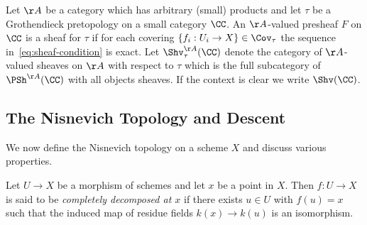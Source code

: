 \documentclass[12pt]{article}
\numberwithin{equation}{section}
\numberwithin{lemma}{section}
\numberwithin{theorem}{section}
\numberwithin{proposition}{section}
\numberwithin{corollary}{section}
\numberwithin{definition}{section}
\numberwithin{example}{section}
\numberwithin{remark}{section}
\begin{document}
\begin{definition}
  Let $\AA$ be a category which has arbitrary (small) products and let
  $\tau$ be a Grothendieck pretopology on a small category $\CC$. An
  $\AA$-valued presheaf $F$ on $\CC$ is a sheaf for $\tau$ if for each
  covering $\{f_i : U_i \to X\} \in \Cov_\tau$ the sequence
  in~\ref{eq:sheaf-condition} is exact. Let $\Shv_\tau^{\AA}(\CC)$
  denote the category of $\AA$-valued sheaves on $\AA$ with respect to
  $\tau$ which is the full subcategory of $\PSh^{\AA}(\CC)$ with all
  objects sheaves. If the context is clear we write $\Shv(\CC)$.
\end{definition}


\subsection{The Nisnevich Topology and Descent}

We now define the Nisnevich topology on a scheme $X$ and discuss
various properties.

\begin{definition}
  Let $U \to X$ be a morphism of schemes and let $x$ be a point in
  $X$. Then $f : U \to X$ is said to be \emph{completely decomposed at
    $x$} if there exists $u \in U$ with $f(u) = x$ such that the
  induced map of residue fields $k(x) \to k(u)$ is an isomorphism.
\end{definition}
\end{document}

